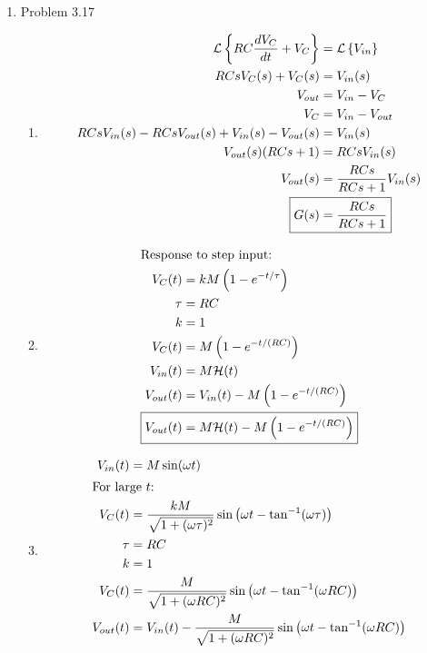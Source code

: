 \documentclass[12pt]{article}
\begin{document}
\begin{enumerate}
\newpage
\item Problem 3.17
\begin{enumerate}
    \item 
    \begin{align*}
        \mathcal{L}\left\{RC \frac{dV_C}{dt} + V_C\right\} &= \mathcal{L}\left\{V_{in}\right\} \\
        RCsV_C(s) + V_C(s) &= V_{in}(s) \\
        V_{out} &= V_{in} - V_C \\
        V_C &= V_{in} - V_{out} \\
         RCsV_{in}(s) - RCsV_{out}(s) + V_{in}(s) - V_{out}(s) &= V_{in}(s) \\
         V_{out}(s) (RCs + 1) &= RCsV_{in}(s) \\ 
         V_{out}(s) &= \frac{RCs}{RCs + 1} V_{in}(s) \\
         \Aboxed{G(s) &= \frac{RCs}{RCs + 1}} \\
    \end{align*}
    \item
    \begin{align*}
        \intertext{Response to step input:}
        V_C(t) &= kM\left(1 - e^{-t/\tau}\right) \\
        \tau &= RC \\
        k &= 1 \\
        V_C(t) &= M\left(1 - e^{-t/(RC)}\right) \\
        V_{in}(t) &= M\mathcal{H}(t) \\
        V_{out}(t) &= V_{in}(t) - M\left(1 - e^{-t/(RC)}\right) \\
        \Aboxed{V_{out}(t) &= M\mathcal{H}(t) - M\left(1 - e^{-t/(RC)}\right)}
    \end{align*}
    \item
    \begin{align*}
        V_{in}(t) &= M\sin(\omega t) \\
        \intertext{For large $t$:}
        V_C(t) &= \frac{kM}{\sqrt{1+(\omega \tau)^2}} \sin\left(\omega t - \tan^{-1}(\omega\tau)\right) \\
        \tau &= RC \\
        k &= 1 \\
        V_C(t) &= \frac{M}{\sqrt{1+(\omega RC)^2}} \sin\left(\omega t - \tan^{-1}(\omega RC)\right) \\
        V_{out}(t) &= V_{in}(t) - \frac{M}{\sqrt{1+(\omega RC)^2}} \sin\left(\omega t - \tan^{-1}(\omega RC)\right) \\

\end{align*}
\end{enumerate}
\end{enumerate}
\end{document}
